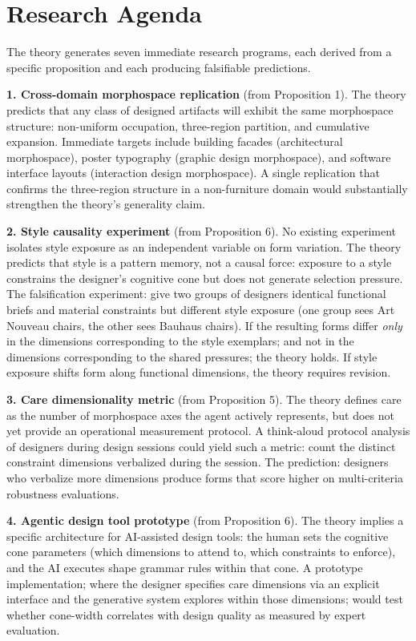 \section{Research Agenda}
\label{sec:agenda}

The theory generates seven immediate research programs, each derived from a specific proposition and each producing falsifiable predictions.

\textbf{1. Cross-domain morphospace replication} (from Proposition 1). The theory predicts that any class of designed artifacts will exhibit the same morphospace structure: non-uniform occupation, three-region partition, and cumulative expansion. Immediate targets include building facades (architectural morphospace), poster typography (graphic design morphospace), and software interface layouts (interaction design morphospace). A single replication that confirms the three-region structure in a non-furniture domain would substantially strengthen the theory's generality claim.

\textbf{2. Style causality experiment} (from Proposition 6). No existing experiment isolates style exposure as an independent variable on form variation. The theory predicts that style is a pattern memory, not a causal force: exposure to a style constrains the designer's cognitive cone but does not generate selection pressure. The falsification experiment: give two groups of designers identical functional briefs and material constraints but different style exposure (one group sees Art Nouveau chairs, the other sees Bauhaus chairs). If the resulting forms differ \textit{only} in the dimensions corresponding to the style exemplars; and not in the dimensions corresponding to the shared pressures; the theory holds. If style exposure shifts form along functional dimensions, the theory requires revision.

\textbf{3. Care dimensionality metric} (from Proposition 5). The theory defines care as the number of morphospace axes the agent actively represents, but does not yet provide an operational measurement protocol. A think-aloud protocol analysis of designers during design sessions could yield such a metric: count the distinct constraint dimensions verbalized during the session. The prediction: designers who verbalize more dimensions produce forms that score higher on multi-criteria robustness evaluations.

\textbf{4. Agentic design tool prototype} (from Proposition 6). The theory implies a specific architecture for AI-assisted design tools: the human sets the cognitive cone parameters (which dimensions to attend to, which constraints to enforce), and the AI executes shape grammar rules within that cone. A prototype implementation; where the designer specifies care dimensions via an explicit interface and the generative system explores within those dimensions; would test whether cone-width correlates with design quality as measured by expert evaluation.

